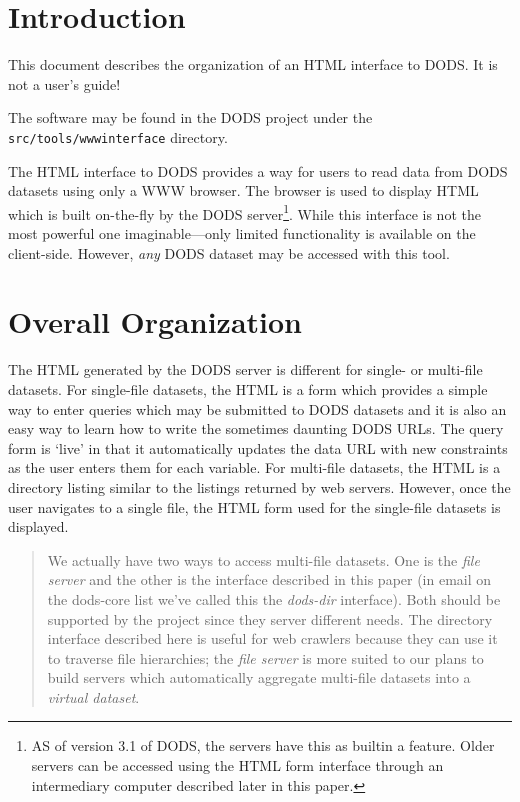 \documentclass{article}
\begin{document}
\section{Introduction}

This document describes the organization of an HTML interface to DODS. It is
not a user's guide!

The software may be found in the DODS project under the {\tt
  src/tools/www\-interface} directory. 

The HTML interface to DODS provides a way for users to read data from DODS
datasets using only a WWW browser.  The browser is used to display HTML which
is built on-the-fly by the DODS server\footnote{AS of version 3.1 of DODS,
  the servers have this as builtin a feature. Older servers can be accessed
  using the HTML form interface through an intermediary computer described
  later in this paper.}. While this interface is not the most powerful one
imaginable---only limited functionality is available on the client-side.
However, \emph{any} DODS dataset may be accessed with this tool.

\section{Overall Organization}

The HTML generated by the DODS server is different for single- or multi-file
datasets. For single-file datasets, the HTML is a form which provides a
simple way to enter queries which may be submitted to DODS datasets and it is
also an easy way to learn how to write the sometimes daunting DODS URLs. The
query form is `live' in that it automatically updates the data URL with new
constraints as the user enters them for each variable.  For multi-file
datasets, the HTML is a directory listing similar to the listings returned by
web servers. However, once the user navigates to a single file, the HTML form
used for the single-file datasets is displayed.

\begin{quote}
  We actually have two ways to access multi-file datasets. One is the
  \emph{file server} and the other is the interface described in this paper
  (in email on the dods-core list we've called this the \emph{dods-dir}
  interface). Both should be supported by the project since they server
  different needs. The directory interface described here is useful for web
  crawlers because they can use it to traverse file hierarchies; the
  \emph{file server} is more suited to our plans to build servers which
  automatically aggregate multi-file datasets into a \emph{virtual dataset}.
\end{quote}
\end{document}
